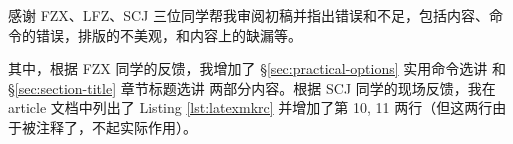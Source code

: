 感谢 FZX、LFZ、SCJ 三位同学帮我审阅初稿并指出错误和不足，包括内容、命令的错误，排版的不美观，和内容上的缺漏等。

其中，根据 FZX 同学的反馈，我增加了 \S \ref{sec:practical-options} 实用命令选讲 和 \S \ref{sec:section-title} 章节标题选讲 两部分内容。根据 SCJ 同学的现场反馈，我在 article 文档中列出了 Listing \ref{lst:latexmkrc} 并增加了第 10, 11 两行（但这两行由于被注释了，不起实际作用）。